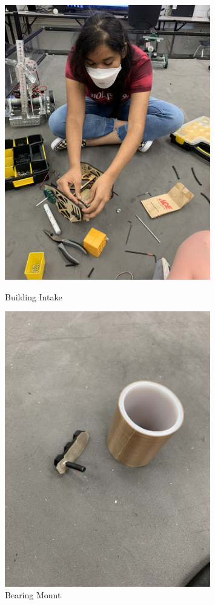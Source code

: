 \begin{figure}[ht]
\centering
\begin{minipage}[b]{.50\textwidth}
  \centering
  \includegraphics[width=0.8\textwidth]{Meetings/August/08-24-21/8-24-21_Hardware_Image3 - Nathan Forrer.JPG}
  \caption{Building Intake}
  \label{fig:pic3}
\end{minipage}%
\hfill%
\begin{minipage}[b]{.50\textwidth}
  \centering
  \includegraphics[width=0.8\textwidth]{Meetings/August/08-24-21/8-24-21_Hardware_Image4 - Nathan Forrer.JPG}
  \caption{Bearing Mount}
  \label{fig:pic4}
\end{minipage}
\end{figure}